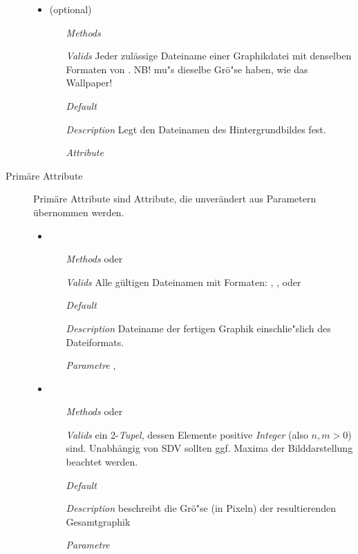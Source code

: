 \begin{description}
\begin{itemize}
\item {} (optional)
\begin{enumerate}
\item[\textit{Methods}] 
\item[\textit{Valids}] Jeder zul\"assige Dateiname einer Graphikdatei
  mit denselben Formaten von .  NB!
   mu"s dieselbe Gr\"o"se haben, wie das Wallpaper!
\item[\textit{Default}] 
\item[\textit{Description}] Legt den Dateinamen des Hintergrundbildes
  fest.
\item[\textit{Attribute}] 
\end{enumerate}

\end{itemize}


\newpage

\item[Prim\"are Attribute] Prim\"are Attribute sind Attribute, die
  unver\"andert aus Parametern \"ubernommen werden.

\begin{itemize}
  
\item {}
\begin{enumerate}
\item[\textit{Methods}]   oder 
\item[\textit{Valids}] Alle g\"ultigen Dateinamen mit Formaten:
  , ,  oder
\item[\textit{Default}] 
\item[\textit{Description}] Dateiname der fertigen Graphik
  einschlie"slich des Dateiformats.
\item[\textit{Parametre}] ,
\end{enumerate}

\item {}
\begin{enumerate}
\item[\textit{Methods}] 
  oder 
\item[\textit{Valids}] ein 2-\textit{Tupel}, dessen Elemente positive
  \textit{Integer} (also $n, m > 0$) sind. Unabh\"angig von SDV
  sollten ggf. Maxima der Bilddarstellung beachtet werden.
\item[\textit{Default}] 
\item[\textit{Description}] beschreibt die Gr\"o"se (in Pixeln) der
  resultierenden Gesamtgraphik
\item[\textit{Parametre}] 
\end{enumerate}


\end{itemize}
\end{description}
